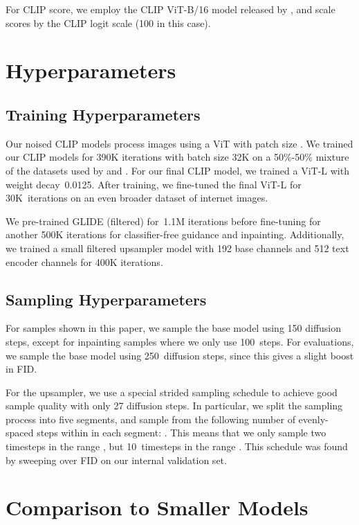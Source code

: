 \documentclass{article}
\newcommand{\modelname}{GLIDE}
\begin{document}
For CLIP score, we employ the CLIP ViT-B/16 model released by \citet{clip}, and scale scores by the CLIP logit scale (100 in this case).

\section{Hyperparameters}

\subsection{Training Hyperparameters}

Our noised CLIP models process  images using a ViT \citep{vit} with patch size . We trained our CLIP models for 390K iterations with batch size 32K on a 50\%-50\% mixture of the datasets used by \citet{clip} and \citet{dalle}. For our final CLIP model, we trained a ViT-L with weight decay~0.0125. After training, we fine-tuned the final ViT-L for 30K~iterations on an even broader dataset of internet images.

We pre-trained \modelname{} (filtered) for~1.1M iterations before fine-tuning for another 500K iterations for classifier-free guidance and inpainting. Additionally, we trained a small filtered upsampler model with 192 base channels and 512 text encoder channels for 400K iterations.

\subsection{Sampling Hyperparameters}

For samples shown in this paper, we sample the base model using 150 diffusion steps, except for inpainting samples where we only use 100~steps. For evaluations, we sample the base model using 250~diffusion steps, since this gives a slight boost in FID.

For the upsampler, we use a special strided sampling schedule to achieve good sample quality with only 27 diffusion steps. In particular, we split the sampling process into five segments, and sample from the following number of evenly-spaced steps within in each segment: . This means that we only sample two timesteps in the range , but 10~timesteps in the range . This schedule was found by sweeping over FID on our internal validation set.

\section{Comparison to Smaller Models}
\label{app:comp_small}
\end{document}
